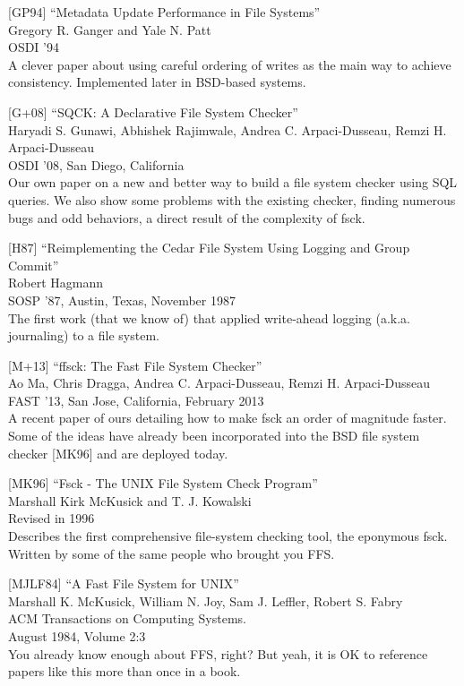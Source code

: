 {[}GP94{]} ``Metadata Update Performance in File Systems''\\
Gregory R. Ganger and Yale N. Patt\\
OSDI '94\\
A clever paper about using careful ordering of writes as the main way to
achieve consistency. Implemented later in BSD-based systems.

{[}G+08{]} ``SQCK: A Declarative File System Checker''\\
Haryadi S. Gunawi, Abhishek Rajimwale, Andrea C. Arpaci-Dusseau, Remzi
H. Arpaci-Dusseau\\
OSDI '08, San Diego, California\\
Our own paper on a new and better way to build a file system checker
using SQL queries. We also show some problems with the existing checker,
finding numerous bugs and odd behaviors, a direct result of the
complexity of fsck.

{[}H87{]} ``Reimplementing the Cedar File System Using Logging and Group
Commit''\\
Robert Hagmann\\
SOSP '87, Austin, Texas, November 1987\\
The first work (that we know of) that applied write-ahead logging
(a.k.a. journaling) to a file system.

{[}M+13{]} ``ffsck: The Fast File System Checker''\\
Ao Ma, Chris Dragga, Andrea C. Arpaci-Dusseau, Remzi H. Arpaci-Dusseau\\
FAST '13, San Jose, California, February 2013\\
A recent paper of ours detailing how to make fsck an order of magnitude
faster. Some of the ideas have already been incorporated into the BSD
file system checker {[}MK96{]} and are deployed today.

{[}MK96{]} ``Fsck - The UNIX File System Check Program''\\
Marshall Kirk McKusick and T. J. Kowalski\\
Revised in 1996\\
Describes the first comprehensive file-system checking tool, the
eponymous fsck. Written by some of the same people who brought you FFS.

{[}MJLF84{]} ``A Fast File System for UNIX''\\
Marshall K. McKusick, William N. Joy, Sam J. Leffler, Robert S. Fabry\\
ACM Transactions on Computing Systems.\\
August 1984, Volume 2:3\\
You already know enough about FFS, right? But yeah, it is OK to
reference papers like this more than once in a book.

